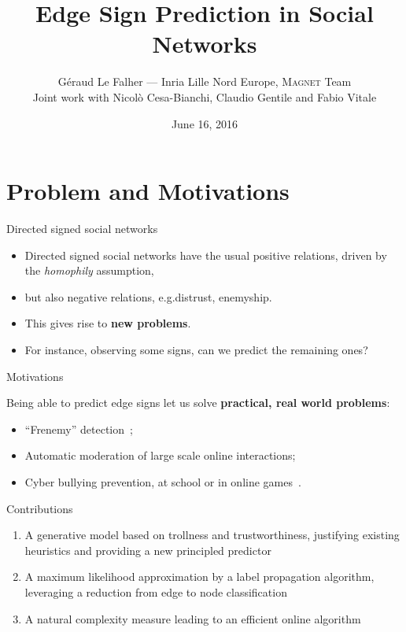 \documentclass[10pt,svgnames,ignorenonframetext,final]{beamer}
\title{Edge Sign Prediction in Social Networks}
\author{Géraud Le Falher --- Inria Lille Nord Europe, \textsc{Magnet} Team\\
  Joint work with Nicolò Cesa-Bianchi, Claudio Gentile and Fabio Vitale}
\date{June 16, 2016}
\providecommand{\largelist}{%
  \setlength{\itemsep}{8pt}\setlength{\parskip}{3pt}}
\begin{document}
\frame{\titlepage}


\section{Problem and Motivations}\label{introduction}

\begin{frame}{Directed signed social networks}

  \begin{itemize}
    \largelist
    \item
      Directed signed social networks have the usual positive relations,
      driven by the \emph{homophily} assumption,
    \item
      but also \alert{negative relations}, e.g.\@ distrust, enemyship.
    \item
      This gives rise to \textbf{new problems}.
    \item
      For instance, observing some signs, can we predict the remaining ones?
  \end{itemize}

\end{frame}

\begin{frame}{Motivations}

  Being able to predict edge signs let us solve \textbf{practical, real world problems}:

  \begin{itemize}
    \largelist
  \item
    ``Frenemy'' detection~\autocite{frenemy12};
  \item
    Automatic moderation of large scale online interactions;
  \item
    Cyber bullying prevention, at school or in online games~\autocite{CyberbullyingCHI15}.
\end{itemize}

\end{frame}

\begin{frame}{Contributions}

  \begin{enumerate}
    \def\labelenumi{\arabic{enumi}.}
    \largelist
  \item
    A \alert{generative model} based on trollness and trustworthiness, justifying
    existing heuristics and providing a \alert{new principled predictor}
  \item
    A maximum likelihood approximation by a \alert{label propagation algorithm},
    leveraging a reduction from \alert{edge to node classification}
  \item
    A \alert{natural complexity measure} leading to an \alert{efficient online algorithm}
\end{enumerate}

\end{frame}
\end{document}
